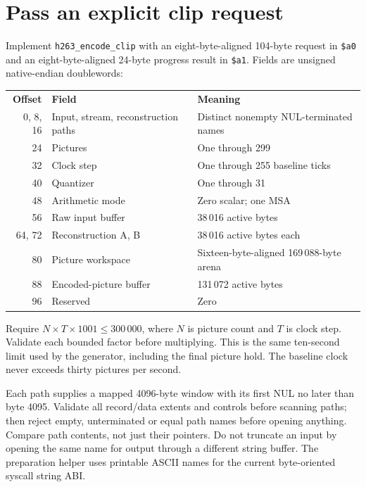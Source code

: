 \section{Pass an explicit clip request}
Implement \texttt{h263\_encode\_clip} with an eight-byte-aligned 104-byte request
in \texttt{\$a0} and an eight-byte-aligned 24-byte progress result in
\texttt{\$a1}. Fields are unsigned native-endian doublewords:
\begin{center}
  \begin{tabular}{rll}
    \textbf{Offset} & \textbf{Field}                      & \textbf{Meaning}                         \\
    0, 8, 16        & Input, stream, reconstruction paths & Distinct nonempty NUL-terminated names   \\
    24              & Pictures                            & One through 299                          \\
    32              & Clock step                          & One through 255 baseline ticks           \\
    40              & Quantizer                           & One through 31                           \\
    48              & Arithmetic mode                     & Zero scalar; one MSA                     \\
    56              & Raw input buffer                    & 38\,016 active bytes                     \\
    64, 72          & Reconstruction A, B                 & 38\,016 active bytes each                \\
    80              & Picture workspace                   & Sixteen-byte-aligned 169\,088-byte arena \\
    88              & Encoded-picture buffer              & 131\,072 active bytes                    \\
    96              & Reserved                            & Zero
  \end{tabular}
\end{center}
Require $N\times T\times1001\leq300\,000$, where $N$ is picture count and $T$
is clock step. Validate each bounded factor before multiplying. This is the
same ten-second limit used by the generator, including the final picture hold.
The baseline clock never exceeds thirty pictures per second.

Each path supplies a mapped 4096-byte window with its first NUL no later than
byte 4095. Validate all record/data extents and controls before scanning paths;
then reject empty, unterminated or equal path names before opening anything.
Compare path contents, not just their pointers. Do not truncate an input by opening
the same name for output through a different string buffer. The preparation helper
uses printable ASCII names for the current byte-oriented syscall string ABI.

